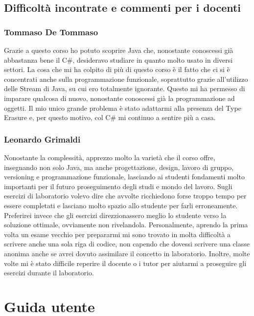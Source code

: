 \documentclass[a4paper,12pt]{report}
\begin{document}
\section{Difficoltà incontrate e commenti per i docenti}
\subsection*{Tommaso De Tommaso}
Grazie a questo corso ho potuto scoprire Java che, nonostante conoscessi già abbastanza bene il C\#, desideravo studiare in quanto molto usato in diversi settori.
%
La cosa che mi ha colpito di più di questo corso è il fatto che ci si è concentrati anche sulla programmazione funzionale, soprattutto grazie all'utilizzo delle Stream di Java, su cui ero totalmente ignorante.
%
Questo mi ha permesso di imparare qualcosa di nuovo, nonostante conoscessi già la programmazione ad oggetti.
%
Il mio unico grande problema è stato adattarmi alla presenza del Type Erasure e, per questo motivo, col C\# mi continuo a sentire più a casa.

\subsection*{Leonardo Grimaldi}

Nonostante la complessità, apprezzo molto la varietà che il corso offre, insegnando non solo Java, ma anche progettazione, design, lavoro di gruppo, versioning e programmazione funzionale, lasciando ai studenti fondamenti molto importanti per il futuro proseguimento degli studi e mondo del lavoro.
%
Sugli esercizi di laboratorio volevo dire che avvolte ricchiedono forse troppo tempo per essere completati e lasciano molto spazio allo studente per farli erroneamente.
%
Preferirei invece che gli esercizi direzzionassero meglio lo studente verso la soluzione ottimale, ovviamente non rivelandola.
%
Personalmente, aprendo la prima volta un esame vecchio per prepararmi mi sono trovato in molta difficoltà a scrivere anche una sola riga di codice, non capendo che dovessi scrivere una classe anonima anche se avrei dovuto assimilare il concetto in laboratorio.
%
Inoltre, molte volte mi è stato difficile reperire il docente o i tutor per aiutarmi a proseguire gli esercizi durante il laboratorio.
%

\appendix
\chapter{Guida utente}
\end{document}
